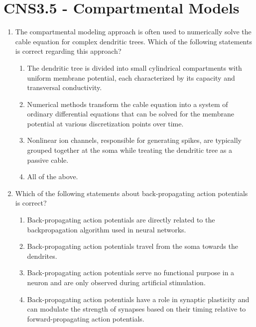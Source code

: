 \documentclass[11pt,letterpaper]{article}
\begin{document}
\section{CNS3.5 - Compartmental Models}
\begin{enumerate}
    \item The compartmental modeling approach is often used to numerically solve the cable equation for complex dendritic trees. Which of the following statements is correct regarding this approach?
    \begin{enumerate}
        \item The dendritic tree is divided into small cylindrical compartments with uniform membrane potential, each characterized by its capacity and transversal conductivity. 
        \item Numerical methods transform the cable equation into a system of ordinary differential equations that can be solved for the membrane potential at various discretization points over time.
        \item Nonlinear ion channels, responsible for generating spikes, are typically grouped together at the soma while treating the dendritic tree as a passive cable.
        \item All of the above.
    \end{enumerate}

    \item Which of the following statements about back-propagating action potentials is correct?
    \begin{enumerate}
        \item Back-propagating action potentials are directly related to the backpropagation algorithm used in neural networks.
        \item Back-propagating action potentials travel from the soma towards the dendrites.
        \item Back-propagating action potentials serve no functional purpose in a neuron and are only observed during artificial stimulation.
        \item Back-propagating action potentials have a role in synaptic plasticity and can modulate the strength of synapses based on their timing relative to forward-propagating action potentials.
    \end{enumerate}


\end{enumerate}

\pagebreak
\end{document}
